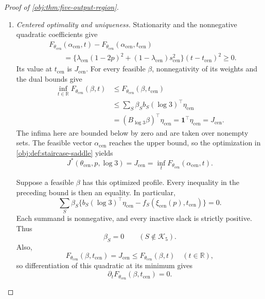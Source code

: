 \begin{proof}[Proof of \cref{obj:thm:five-output-region}]
\begin{enumerate}
\item \textit{Centered optimality and uniqueness.}
Stationarity and the nonnegative quadratic coefficients give
\[
\begin{aligned}
&F_{\theta_{\mathrm{cen}}}(\alpha_{\mathrm{cen}},t)
-F_{\theta_{\mathrm{cen}}}(\alpha_{\mathrm{cen}},t_{\mathrm{cen}})\\
&\qquad=
\bigl\{\lambda_{\mathrm{cen}}(1-2p)^2
 +(1-\lambda_{\mathrm{cen}})s_{\mathrm{cen}}^2\bigr\}
(t-t_{\mathrm{cen}})^2\ge0.
\end{aligned}
\]
Its value at \(t_{\mathrm{cen}}\) is \(J_{\mathrm{cen}}\).
For every feasible \(\beta\), nonnegativity of its weights and the dual
bounds give
\[
\begin{aligned}
\inf_{t\in\mathbb R}F_{\theta_{\mathrm{cen}}}(\beta,t)
&\le F_{\theta_{\mathrm{cen}}}(\beta,t_{\mathrm{cen}})\\
&\le\sum_S\beta_S b_S(\log3)^\top\eta_{\mathrm{cen}}\\
&=(B_{\log3}\beta)^\top\eta_{\mathrm{cen}}
=\mathbf1^\top\eta_{\mathrm{cen}}
=J_{\mathrm{cen}}.
\end{aligned}
\]
The infima here are bounded below by zero and are taken over nonempty
sets. The feasible vector \(\alpha_{\mathrm{cen}}\) reaches the upper
bound, so the optimization in \cref{obj:def:staircase-saddle} yields
\[
J^*(\theta_{\mathrm{cen}},p,\log3)
=
J_{\mathrm{cen}}
=
\inf_tF_{\theta_{\mathrm{cen}}}(\alpha_{\mathrm{cen}},t).
\]

Suppose a feasible \(\beta\) has this optimized profile. Every inequality
in the preceding bound is then an equality. In particular,
\[
\sum_S\beta_S
\bigl\{b_S(\log3)^\top\eta_{\mathrm{cen}}
       -f_S(\xi_{\mathrm{cen}}(p),t_{\mathrm{cen}})\bigr\}=0.
\]
Each summand is nonnegative, and every inactive slack is strictly
positive. Thus
\[
\beta_S=0\qquad(S\notin\mathcal K_5).
\]
Also,
\[
F_{\theta_{\mathrm{cen}}}(\beta,t_{\mathrm{cen}})
=
J_{\mathrm{cen}}
\le F_{\theta_{\mathrm{cen}}}(\beta,t)
\quad(t\in\mathbb R),
\]
so differentiation of this quadratic at its minimum gives
\[
\partial_tF_{\theta_{\mathrm{cen}}}(\beta,t_{\mathrm{cen}})=0.
\]


\end{enumerate}
\end{proof}
